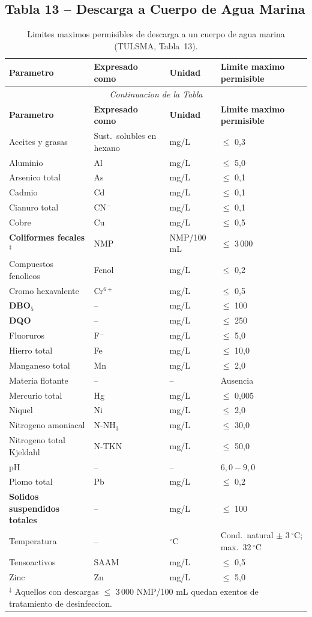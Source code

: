 \documentclass[12pt,a4paper]{article}
\begin{document}
\subsection{Tabla 13 -- Descarga a Cuerpo de Agua Marina}
\small
\begin{longtable}{p{4.5cm}p{2.0cm}p{2.0cm}p{3.5cm}}
\caption{Limites maximos permisibles de descarga a un cuerpo de agua marina (TULSMA, Tabla~13).}\\
\toprule
\textbf{Parametro} & \textbf{Expresado como} & \textbf{Unidad} & \textbf{Limite maximo permisible} \\
\midrule
\endfirsthead
\multicolumn{4}{c}{\small\itshape Continuacion de la Tabla}\\
\toprule
\textbf{Parametro} & \textbf{Expresado como} & \textbf{Unidad} & \textbf{Limite maximo permisible} \\
\midrule
\endhead
\bottomrule
\endlastfoot
Aceites y grasas & Sust.\ solubles en hexano & mg/L & $\leq$ 0,3 \\
Aluminio & Al & mg/L & $\leq$ 5,0 \\
Arsenico total & As & mg/L & $\leq$ 0,1 \\
Cadmio & Cd & mg/L & $\leq$ 0,1 \\
Cianuro total & CN$^-$ & mg/L & $\leq$ 0,1 \\
Cobre & Cu & mg/L & $\leq$ 0,5 \\
\textbf{Coliformes fecales}$^\ddagger$ & NMP & NMP/100 mL & $\leq$ 3\,000 \\
Compuestos fenolicos & Fenol & mg/L & $\leq$ 0,2 \\
Cromo hexavalente & Cr$^{6+}$ & mg/L & $\leq$ 0,5 \\
\textbf{DBO$_5$} & -- & mg/L & $\leq$ 100 \\
\textbf{DQO} & -- & mg/L & $\leq$ 250 \\
Fluoruros & F$^-$ & mg/L & $\leq$ 5,0 \\
Hierro total & Fe & mg/L & $\leq$ 10,0 \\
Manganeso total & Mn & mg/L & $\leq$ 2,0 \\
Materia flotante & -- & -- & Ausencia \\
Mercurio total & Hg & mg/L & $\leq$ 0,005 \\
Niquel & Ni & mg/L & $\leq$ 2,0 \\
Nitrogeno amoniacal & N-NH$_3$ & mg/L & $\leq$ 30,0 \\
Nitrogeno total Kjeldahl & N-TKN & mg/L & $\leq$ 50,0 \\
pH & -- & -- & $6,0 - 9,0$ \\
Plomo total & Pb & mg/L & $\leq$ 0,2 \\
\textbf{Solidos suspendidos totales} & -- & mg/L & $\leq$ 100 \\
Temperatura & -- & $^\circ$C & Cond.\ natural $\pm$ 3\,$^\circ$C; max.\ 32\,$^\circ$C \\
Tensoactivos & SAAM & mg/L & $\leq$ 0,5 \\
Zinc & Zn & mg/L & $\leq$ 5,0 \\
\multicolumn{4}{l}{\footnotesize $^\ddagger$ Aquellos con descargas $\leq$ 3\,000 NMP/100 mL quedan exentos de tratamiento de desinfeccion.}\\
\end{longtable}
\end{document}

